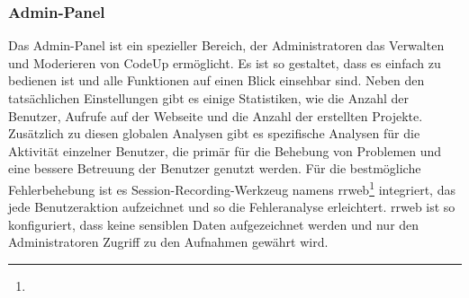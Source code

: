 \documentclass{subfiles}
\begin{document}
\subsubsection{Admin-Panel}
Das Admin-Panel ist ein spezieller Bereich, der Administratoren das Verwalten und Moderieren von CodeUp ermöglicht.
Es ist so gestaltet, dass es einfach zu bedienen ist und alle Funktionen auf einen Blick einsehbar sind.
Neben den tatsächlichen Einstellungen gibt es einige Statistiken, wie die Anzahl der Benutzer, Aufrufe auf der Webseite und die Anzahl der erstellten Projekte.
Zusätzlich zu diesen globalen Analysen gibt es spezifische Analysen für die Aktivität einzelner Benutzer, die primär für die Behebung von Problemen und eine bessere Betreuung der Benutzer genutzt werden.
Für die bestmögliche Fehlerbehebung ist es Session-Recording-Werkzeug namens rrweb\footnote{} integriert, das jede Benutzeraktion aufzeichnet und so die Fehleranalyse erleichtert.
rrweb ist so konfiguriert, dass keine sensiblen Daten aufgezeichnet werden und nur den Administratoren Zugriff zu den Aufnahmen gewährt wird.
\end{document}
